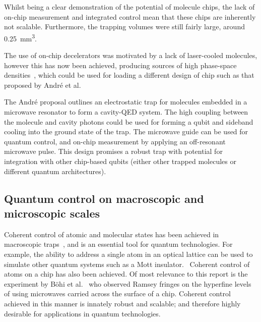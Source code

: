 Whilst being a clear demonstration of the potential of
molecule chips, the lack of on-chip measurement and integrated control mean that
these chips are inherently not scalable.  Furthermore, the trapping volumes were
still fairly large, around \SI{0.25}{\milli\metre\cubed}. 

The use of on-chip decelerators was motivated by a lack of laser-cooled
molecules, however this has now been achieved, producing sources of high
phase-space densities~\cite{Truppe2017}, which could be used for loading a
different design of chip such as that proposed by Andr\'e et
al.~\cite{Andre2006}

The Andr\'e proposal outlines an electrostatic trap for molecules embedded in a
microwave resonator to form a cavity-QED system. The high coupling between the
molecule and cavity photons could be used for forming a qubit and sideband
cooling into the ground state of the trap. The microwave guide can be used for
quantum control, and on-chip measurement by applying an off-resonant microwave
pulse. This design promises a robust trap with potential for integration with
other chip-based qubits (either other trapped molecules or different quantum
architectures).

\subsection{Quantum control on macroscopic and microscopic scales}
\label{litrev:control}


Coherent control of atomic and molecular states has been achieved in macroscopic
traps~, and is an essential tool for quantum technologies. For example, the
ability to address a single atom in an optical lattice can be used to simulate
other quantum systems such as a Mott insulator.~\cite{Weitenberg2011} Coherent
control of atoms on a chip has also been achieved. Of most relevance to this
report is the experiment by B\"ohi et al.~\cite{Boehi2009} who observed Ramsey
fringes on the hyperfine levels of  using microwaves carried across the
surface of a chip. Coherent control achieved in this manner is innately robust
and scalable; and therefore highly desirable for applications in quantum
technologies.~\cite{}

